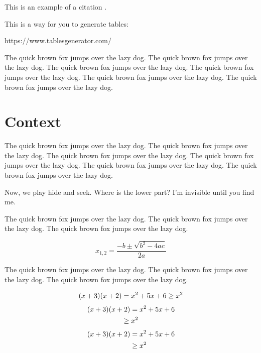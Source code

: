 \documentclass[11pt,a4paper]{report}
\begin{document}
This is an example of a citation \cite{Pedro2019}.

This is a way for you to generate tables:

https://www.tablesgenerator.com/

The quick brown fox jumps over the lazy dog. The quick brown fox jumps over the lazy dog. The quick brown fox jumps over the lazy dog. The quick brown fox jumps over the lazy dog. The quick brown fox jumps over the lazy dog. The quick brown fox jumps over the lazy dog.

\section{Context}
\label{sec:context}
The quick brown fox jumps over the lazy dog. The quick brown fox jumps over the lazy dog. The quick brown fox jumps over the lazy dog. The quick brown fox jumps over the lazy dog. The quick brown fox jumps over the lazy dog. The quick brown fox jumps over the lazy dog.

\begin{tcolorbox}[colback=yellow!10!white,colframe=red!75!black,%
  savelowerto=\jobname_ex.tex]
  Now, we play hide and seek. Where is the lower part?
  \tcblower
  I'm invisible until you find me.
\end{tcolorbox}

The quick brown fox jumps over the lazy dog. The quick brown fox jumps over the lazy dog. The quick brown fox jumps over the lazy dog. 

\begin{equation}
	x_{1,2}=\frac{-b\pm\sqrt{b^2-4ac}}{2a}
\end{equation}

The quick brown fox jumps over the lazy dog.
The quick brown fox jumps over the lazy dog. The quick brown fox jumps over the lazy dog.

\begin{equation}
	(x+3)(x+2)=x^2+5x+6\notag\\
	\geq x^2
\end{equation}
\begin{gather}
	(x+3)(x+2)=x^2+5x+6\notag\\
	\geq x^2
\end{gather}
\begin{align}
	(x+3)(x+2)&=x^2+5x+6\notag\\
	&\geq x^2
\end{align}
\end{document}

